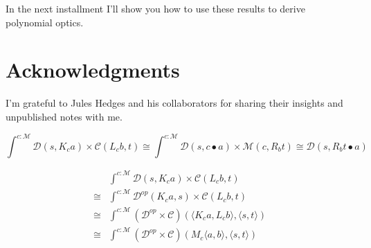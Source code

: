 \documentclass[11pt]{amsart}
\begin{document}
In the next installment I'll show you how to use these results to derive polynomial optics.

\section{Acknowledgments}
I'm grateful to Jules Hedges and his collaborators for sharing their insights and unpublished notes with me.


\[  \int^{c \colon \mathcal{M}} \mathcal{D}(s, K_c a) \times  \mathcal{C}(L_c b, t) \cong  \int^{c \colon \mathcal{M}} \mathcal{D}(s, c \bullet a) \times  \mathcal{M}(c, R_b t) \cong  \mathcal{D}(s, R_b t \bullet a) \]

\begin{align*}
  &\int^{c \colon \mathcal{M}} \mathcal{D}(s, K_c a) \times  \mathcal{C}(L_c b, t) 
  \\
 \cong &\int^{c \colon \mathcal{M}} \mathcal{D}^{op}(K_c a, s) \times  \mathcal{C}(L_c b, t)
 \\
 \cong &\int^{c \colon \mathcal{M}} (\mathcal{D}^{op} \times  \mathcal{C})(\langle K_c a, L_c b \rangle, \langle s, t \rangle)
 \\
\cong &\int^{c \colon \mathcal{M}} (\mathcal{D}^{op} \times  \mathcal{C})(M_c \langle a, b \rangle, \langle s, t \rangle)
\end{align*}
\end{document}
